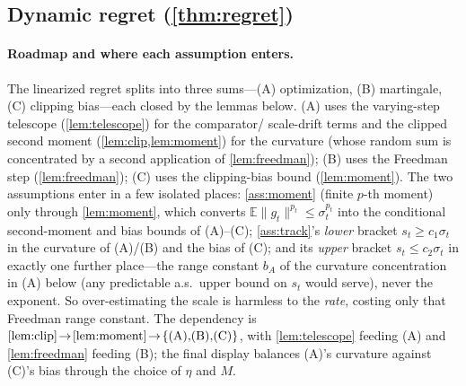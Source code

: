 \documentclass{article}
\newcommand{\E}{\mathbb{E}}
\newcommand{\norm}[1]{\lVert #1 \rVert}
\newcommand{\gt}{g_t}
\begin{document}
\subsection{Dynamic regret (\texorpdfstring{\cref{thm:regret}}{Theorem 2})}

\paragraph{Roadmap and where each assumption enters.} The linearized regret splits into
three sums---(A) optimization, (B) martingale, (C) clipping bias---each closed by the
lemmas below. (A) uses the varying-step telescope (\cref{lem:telescope}) for the comparator/
scale-drift terms and the clipped second moment (\cref{lem:clip,lem:moment}) for the
curvature (whose random sum is concentrated by a second application of \cref{lem:freedman});
(B) uses the Freedman step (\cref{lem:freedman}); (C) uses the clipping-bias
bound (\cref{lem:moment}). The two assumptions enter in a few isolated places:
\cref{ass:moment} (finite $p$-th moment) only through \cref{lem:moment}, which converts
$\E\norm{\gt}^{p_t}\le\sigma_t^{p_t}$ into the conditional second-moment and bias bounds
of (A)--(C); \cref{ass:track}'s \emph{lower} bracket $s_t\ge c_1\sigma_t$ in the
curvature of (A)/(B) and the bias of (C); and its \emph{upper} bracket $s_t\le c_2\sigma_t$
in exactly one further place---the range constant $b_A$ of the curvature concentration in (A)
below (any predictable a.s.\ upper bound on $s_t$ would serve), never the exponent. So
over-estimating the scale is harmless to the \emph{rate}, costing only that Freedman range
constant. The dependency is
$\cref{lem:clip}\!\to\!\cref{lem:moment}\!\to\!\{\text{(A),(B),(C)}\}$, with
\cref{lem:telescope} feeding (A) and \cref{lem:freedman} feeding (B); the final display
balances (A)'s curvature against (C)'s bias through the choice of $\eta$ and $M$.
\end{document}
